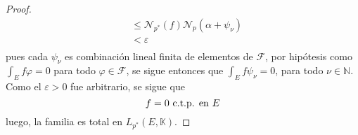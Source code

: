 \documentclass[12pt]{report}
\theoremstyle{largebreak}
\newcommand{\N}[2]{\ensuremath{\mathcal{N}_{#1}\left(#2\right)}}
\begin{document}
\begin{proof}
\begin{equation*}
\begin{split}
                &\leq\N{p^*}{f}\N{p}{\alpha+\psi_\nu}\\
                &<\varepsilon\\
            \end{split}
        \end{equation*}
        pues cada $\psi_\nu$ es combinación lineal finita de elementos de $\mathcal{F}$, por hipótesis como $\int_E f\varphi=0$ para todo $\varphi\in\mathcal{F}$, se sigue entonces que $\int_E f\psi_\nu=0$, para todo $\nu\in\mathbb{N}$. Como el $\varepsilon>0$ fue arbitrario, se sigue que
        \begin{equation*}
            f=0\textup{ c.t.p. en }E
        \end{equation*}
        luego, la familia es total en $L_{p^*}(E,\mathbb{K})$.
    \end{proof}
\end{document}
